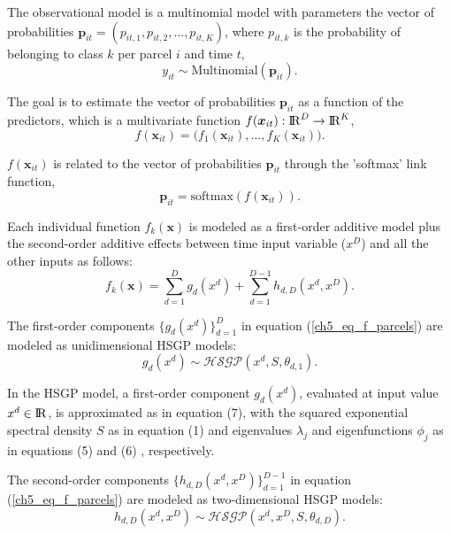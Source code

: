 \documentclass[onecolumn,a4paper,11pt]{article}
\begin{document}
The observational model is a multinomial model with parameters the vector of probabilities $\bm{p}_{it}=(p_{it,1},p_{it,2},\dots,p_{it,K})$, where $p_{it,k}$ is the probability of belonging to class $k$ per parcel $i$ and time $t$,
%
\begin{equation*}
y_{it} \sim \mathrm{Multinomial}(\bm{p}_{it}).
\end{equation*}

\noindent The goal is to estimate the vector of probabilities $\bm{p}_{it}$ as a function of the predictors, which is a multivariate function $f(\bm{x}_{it}):{\rm I\!R}^{D} \rightarrow {\rm I\!R}^{K}$,
$$
f(\bm{x}_{it})=\big(f_1(\bm{x}_{it}),\dots,f_K(\bm{x}_{it}) \big).
$$

\noindent $f(\bm{x}_{it})$ is related to the vector of probabilities $\bm{p}_{it}$ through the 'softmax' link function,
%
\begin{equation*}
\bm{p}_{it} = \mathrm{softmax}(f(\bm{x}_{it})).
\end{equation*}

Each individual function $f_k(\bm{x})$ is modeled as a first-order additive model plus the second-order additive effects between time input variable ($x^D$) and all the other inputs as follows: 
%
\begin{equation} \label{ch5_eq_f_parcels}
f_k(\bm{x}) = \sum_{d=1}^{D} g_d(x^d) + \sum_{d=1}^{D-1} h_{d,D}(x^d,x^D).
\end{equation}

\noindent The first-order components $\{g_d(x^d)\}_{d=1}^D$ in equation (\ref{ch5_eq_f_parcels}) are modeled as unidimensional HSGP models:
%
\begin{equation*}
g_d(x^d) \sim \mathcal{HSGP}(x^d, S, \theta_{d,1}).
\end{equation*}

\noindent In the HSGP model, a first-order component $g_d(x^d)$, evaluated at input value $x^d \in {\rm I\!R}$, is approximated as in equation (7), %
with the squared exponential spectral density $S$ as in equation (1) %
 and eigenvalues $\lambda_j$  and eigenfunctions $\phi_j$ as in equations (5) %
and (6)%
  , respectively. 

The second-order components $\{h_{d,D}(x^d,x^D)\}_{d=1}^{D-1}$ in equation (\ref{ch5_eq_f_parcels}) are modeled as two-dimensional HSGP models:
%
\begin{equation*}
h_{d,D}(x^d,x^D) \sim \mathcal{HSGP}(x^d,x^D, S, \theta_{d,D}).
\end{equation*} 
\end{document}
